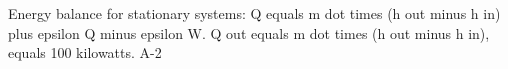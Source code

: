 Energy balance for stationary systems:  
Q equals m dot times (h out minus h in) plus epsilon Q minus epsilon W.  
Q out equals m dot times (h out minus h in), equals 100 kilowatts.  
A-2